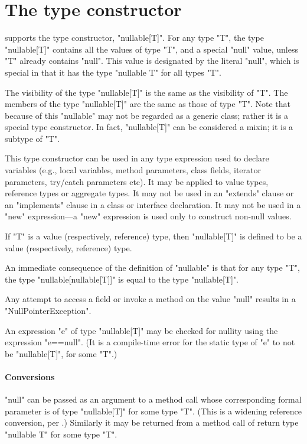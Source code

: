 \section{The  type constructor}
\label{NullableTypeConstructor}

\Xten{} supports the type constructor, \xcd"nullable[T]".  For any
type \xcd"T", the type \xcd"nullable[T]" contains all the values of
type \xcd"T", and a special \xcd"null" value, unless \xcd"T" already
contains \xcd"null". This value is designated by the literal
\xcd"null", which is special in that it has the type
\xcd"nullable T" for all types \xcd"T".

The visibility of the type \xcd"nullable[T]" is the same as the
visibility of \xcd"T". The members of the type \xcd"nullable[T]" are
the same as those of type \xcd"T". Note that because of this
\xcd"nullable" may not be regarded as a generic class; rather it is a
special type constructor.  In fact, \xcd"nullable[T]" can be
considered a mixin; it is a subtype of \xcd"T".


This type constructor can be used in any type expression used to
declare variables (e.g., local variable{s}, method parameter{s},
class field{s}, iterator parameter{s}, try/catch parameter{s} etc).
It may be applied to value types, reference types or aggregate types.
It may not be used in an \xcd"extends" clause or an \xcd"implements"
clause in a class or interface declaration. It may not be used 
in a \xcd"new" expression---a \xcd"new" expression is used only to construct 
non-null values.

If \xcd"T" is a value
(respectively, reference) type, then \xcd"nullable[T]" is defined to be
a value (respectively, reference) type.

An immediate consequence of the definition of \xcd"nullable" is that
for any type \xcd"T", the type \xcd"nullable[nullable[T]]" is equal to
the type \xcd"nullable[T]".

Any attempt to access a field or invoke a method on the value
\xcd"null" results in a \xcd"NullPointerException".

An expression \xcd"e" of type \xcd"nullable[T]" may be checked for nullity
using the expression \xcd"e==null". (It is a compile-time error for
the static type of \xcd"e" to not be \xcd"nullable[T]", for some \xcd"T".)

\paragraph{Conversions}
\xcd"null" can be passed as an argument to a method call whose
corresponding formal parameter is of type \xcd"nullable[T]" for some type
\xcd"T". (This is a widening reference conversion, per \cite[Sec
5.1.4]{jls2}.) Similarly it may be returned from a method call of
return type \xcd"nullable T" for some type \xcd"T".

